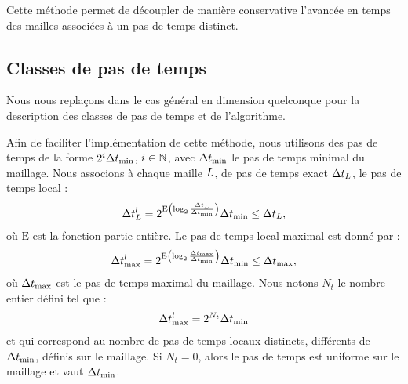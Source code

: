 \begin{figure}[!h]
\begin{center}
{
		}
	\end{center}
\end{figure}

Cette méthode permet de découpler de manière conservative l'avancée en temps
des mailles associées à un pas de temps distinct.
\\

\subsection{Classes de pas de temps}
\label{ssect:lts2_implem_classes}

\begin{remark}
	Nous nous replaçons dans le cas général en dimension quelconque
	pour la description des classes de pas de temps et de l'algorithme.
\end{remark}


Afin de faciliter l'implémentation de cette méthode, nous utilisons
des pas de temps de la forme $2^i \Delta t_{\min}$, $i \in \mathbb{N}$, avec
$\Delta t_{\min}$ le pas de temps minimal du maillage.
Nous associons à chaque maille $L$, de pas de temps exact
$\Delta t_L$, le pas de temps local :
\begin{align}
	\Delta t_L^l = 2^{
		\mathrm{E} \left( \log_2 \frac{\Delta t_L}{\Delta t_{\min}} \right)}
		\Delta t_{\min} \le \Delta t_L ,
\end{align}
où $\mathrm{E}$ est la fonction partie entière.
Le pas de temps local maximal est donné par :
\begin{align}
	\Delta t^l_{\max} = 2^{
		\mathrm{E} \left( \log_2 \frac{\Delta t_{\max}}{\Delta t_{\min}} \right)}
		\Delta t_{\min} \le \Delta t_{\max} ,
\end{align}
où $\Delta t_{\max}$ est le pas de temps maximal du maillage.
Nous notons $N_t$ le nombre entier défini tel que :
\begin{align}
	\Delta t^l_{\max} = 2^{N_t} \Delta t_{\min}
\end{align}
et qui correspond au nombre de pas de temps locaux distincts,
différents de $\Delta t_{\min}$,
définis sur le maillage. Si $N_t = 0$, alors le pas de temps
est uniforme sur le maillage et vaut $\Delta t_{\min}$.

